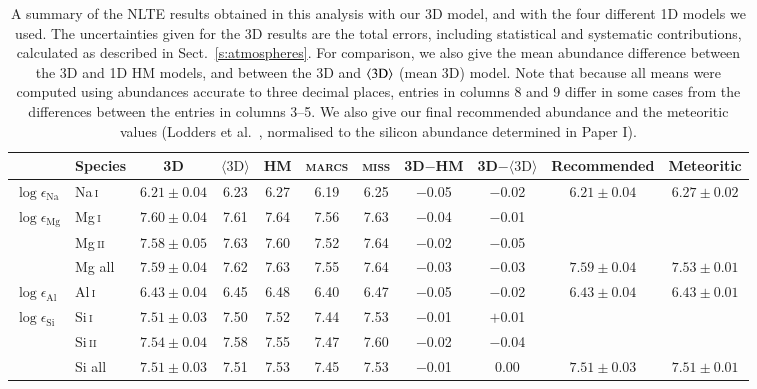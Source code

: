 \documentclass[traditabstract]{aa}
\newcommand{\ph}{\phantom{$-$}}
\newcommand{\oneDAV}{$\langle\mathrm{3D}\rangle$}
\newcommand{\miss}{\textsc{miss}}
\newcommand{\altnai}{Na\,\textsc{i}}
\newcommand{\altmgi}{Mg\,\textsc{i}}
\newcommand{\altmgii}{Mg\,\textsc{ii}}
\newcommand{\altali}{Al\,\textsc{i}}
\newcommand{\altsii}{Si\,\textsc{i}}
\newcommand{\altsiii}{Si\,\textsc{ii}}
\newcommand{\nai}{\altnai\ }
\newcommand{\mgi}{\altmgi\ }
\newcommand{\mgii}{\altmgii\ }
\newcommand{\ali}{\altali\ }
\newcommand{\sii}{\altsii\ }
\newcommand{\siii}{\altsiii\ }
\begin{document}
\begin{table}[tbp]
\centering
\caption{A summary of the NLTE results obtained in this analysis with our 3D model, and with the four different 1D models we used.  The uncertainties given for the 3D results are the total errors, including statistical and systematic contributions, calculated as described in Sect.~\ref{s:atmospheres}.  For comparison, we also give the mean abundance difference between the 3D and 1D HM models, and between the 3D and $\langle 3{\rm D}\rangle$ (mean 3D) model.  Note that because all means were computed using abundances accurate to three decimal places, entries in columns 8 and 9 differ in some cases from the differences between the entries in columns 3--5.  We also give our final recommended abundance and the meteoritic values (Lodders et al.\ \cite{lodd}, normalised to the silicon abundance determined in Paper I).}
\label{table:summary}
\begin{tabular}{l l c c c c c c c c c}
\hline
\hline
& Species & 3D & \oneDAV & HM & \textsc{marcs} & \miss & 3D$-$HM & 3D$-$\oneDAV & Recommended & Meteoritic\\
\hline
$\log \epsilon_\mathrm{Na}$     & \nai  &  $6.21\pm0.04$ & 6.23 & 6.27 & 6.19 & 6.25 & $-$0.05 & $-$0.02 & $6.21\pm0.04$ & $6.27\pm0.02$ \vspace{1mm}\\
$\log \epsilon_\mathrm{Mg}$     & \mgi  &  $7.60\pm0.04$ & 7.61 & 7.64 & 7.56 & 7.63 & $-$0.04 & $-$0.01 &  \\
                                			& \mgii &  $7.58\pm0.05$ & 7.63 & 7.60 & 7.52 & 7.64 & $-$0.02 & $-$0.05 & \\
                                			& Mg all&  $7.59\pm0.04$ & 7.62 & 7.63 & 7.55 & 7.64 & $-$0.03 & $-$0.03 & $7.59\pm0.04$ & $7.53\pm0.01$ \vspace{1mm} \\
$\log \epsilon_\mathrm{Al}$     & \ali  &  $6.43\pm0.04$ & 6.45 & 6.48 & 6.40 & 6.47 & $-$0.05 & $-$0.02 & $6.43\pm0.04$ & $6.43\pm0.01$ \vspace{1mm}\\
$\log \epsilon_\mathrm{Si}$     & \sii  &  $7.51\pm0.03$ & 7.50 & 7.52 & 7.44 & 7.53 & $-$0.01 & $+$0.01 & \\
                                			& \siii &  $7.54\pm0.04$ & 7.58 & 7.55 & 7.47 & 7.60 & $-$0.02 & $-$0.04 & \\
                             			& Si all&  $7.51\pm0.03$ & 7.51 & 7.53 & 7.45 & 7.53 & $-$0.01 & \ph0.00 & $7.51\pm0.03$ & $7.51\pm0.01$ \vspace{1mm} \\

\end{tabular}
\end{table}
\end{document}

